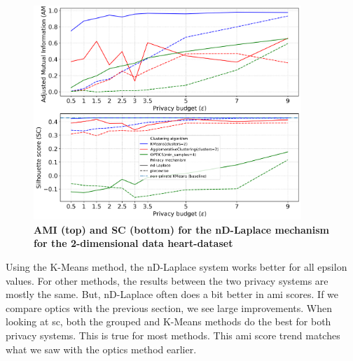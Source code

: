 \newpage
\begin{figure}[H]
  \centering
  \caption{\textbf{AMI (top) and SC (bottom) for the nD-Laplace mechanism for the 2-dimensional data heart-dataset}}
  \includegraphics[width=0.9\textwidth]{Results/nd-laplace/nd-Laplace/heart-dataset/ami-and-sc_2_dimensions.png}

  \label{fig:validation-heart-dataset_comparison_2d-laplace}
\end{figure}
Using the K-Means method, the nD-Laplace system works better for all epsilon values. For other methods, the results between the two privacy systems are mostly the same. But, nD-Laplace often does a bit better in \gls{ami} scores. If we compare \gls{optics} with the previous section, we see large improvements.
When looking at \gls{sc}, both the grouped and K-Means methods do the best for both privacy systems. This is true for most methods. This \gls{ami} score trend matches what we saw with the \gls{optics} method earlier.


